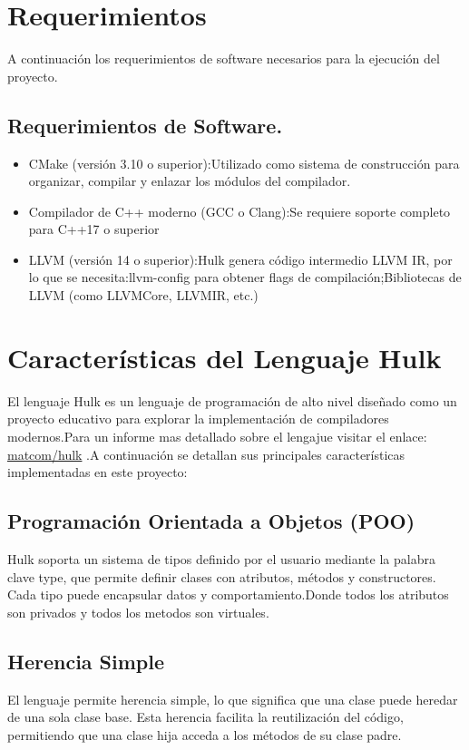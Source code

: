 \documentclass[a4paper,12pt]{article}
\begin{document}
\newpage
\section{Requerimientos}
A continuación los requerimientos de software necesarios para la ejecución del proyecto.

\subsection{Requerimientos de Software.}
\begin{itemize}
	\item CMake (versión 3.10 o superior):Utilizado como sistema de construcción para organizar, compilar y enlazar los módulos del compilador.
	
	\item Compilador de C++ moderno (GCC o Clang):Se requiere soporte completo para C++17 o superior
	
	\item LLVM (versión 14 o superior):Hulk genera código intermedio LLVM IR, por lo que se necesita:llvm-config para obtener flags de compilación;Bibliotecas de LLVM (como LLVMCore, LLVMIR, etc.)
	

\end{itemize}

\section{Características del Lenguaje Hulk}
El lenguaje Hulk es un lenguaje de programación de alto nivel diseñado como un proyecto educativo para explorar la implementación de compiladores modernos.Para un informe mas detallado sobre el lengajue visitar el enlace:  \href{https://matcom.in/hulk/}{matcom/hulk} .A continuación se detallan sus principales características implementadas en este proyecto:
\subsection{Programación Orientada a Objetos (POO)}
Hulk soporta un sistema de tipos definido por el usuario mediante la palabra clave type, que permite definir clases con atributos, métodos y constructores. Cada tipo puede encapsular datos y comportamiento.Donde todos los atributos son privados y todos los metodos son virtuales.

\subsection{Herencia Simple}
El lenguaje permite herencia simple, lo que significa que una clase puede heredar de una sola clase base. Esta herencia facilita la reutilización del código, permitiendo que una clase hija acceda a los métodos de su clase padre.
\end{document}
